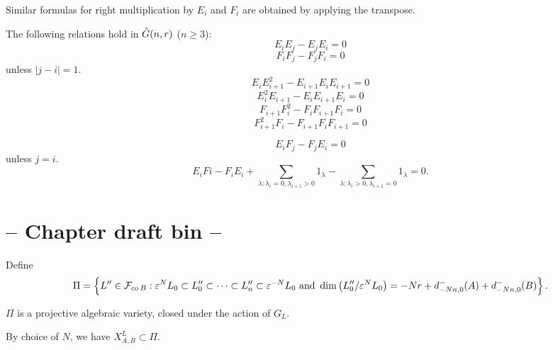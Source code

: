 \documentclass[a4paper, 11pt]{report}
\begin{document}
Similar formulas for right multiplication by $E_i$ and $F_i$ are obtained by applying the transpose.

\begin{lemma}
The following relations hold in $\hat{G}(n,r)$ ($n\geq 3$):
\begin{equation*}
E_iE_j - E_jE_i = 0
\end{equation*}
\begin{equation*}
F_iF_j - F_jF_i = 0
\end{equation*}
unless $|j-i|=1$.
\begin{equation*}
E_iE_{i+1}^2 - E_{i+1}E_iE_{i+1} = 0
\end{equation*}
\begin{equation*}
E_i^2E_{i+1} - E_iE_{i+1}E_i = 0
\end{equation*}
\begin{equation*}
F_{i+1}F_i^2 - F_iF_{i+1}F_i = 0
\end{equation*}
\begin{equation*}
F_{i+1}^2F_i - F_{i+1}F_iF_{i+1} = 0
\end{equation*}

\begin{equation*}
E_iF_j - F_jE_i = 0
\end{equation*}
unless $j=i$.
\begin{equation*}
E_iFi - F_iE_i + \sum_{\lambda:\lambda_i = 0,\lambda_{i+1}>0} 1_\lambda - \sum_{\lambda:\lambda_i>0, \lambda_{i+1}=0} 1_\lambda = 0.
\end{equation*}
\end{lemma}


\section{ -- Chapter draft bin -- }

Define
\begin{equation*}
\Pi = \left\{L''\in\mathcal{F}_{\operatorname{co}{B}} : \varepsilon^N L_0 \subset L_0''\subset\cdots\subset L_n''\subset \varepsilon^{-N} L_0 \text{ and } \dim\left(L_0''/{\varepsilon^N L_0}\right) = -Nr + d_{-Nn,0}^-(A) + d_{-Nn,0}^-(B) \right\}.
\end{equation*}

\begin{lemma}
$\Pi$ is a projective algebraic variety, closed under the action of $G_L$.
\end{lemma}

By choice of $N$, we have $X_{A,B}^L\subset\Pi$.
\end{document}
